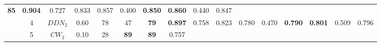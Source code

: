 \begin{table}[tph]
\begin{adjustbox}{angle=90}
{\begin{tabular}{c|c|cc|ccc|ccc|ccc|ccc}
                \textbf{85}
                                                                        &
                \textbf{0.904}
                                                                        & 0.727
                                                                        & 0.833                          &
                0.857                                                   & 0.400
                                                                        &
                \textbf{0.850}
                                                                        &
                \textbf{0.860}
                                                                        & 0.440
                                                                        & 0.847
                \\
                                                                        & 4
                                                                        & $DDN_{2}$                      & 0.60
                                                                        & 78                             & 47
                                                                        &
                \textbf{79}
                                                                        &
                \textbf{0.897}
                                                                        & 0.758
                                                                        & 0.823                          &
                0.780                                                   & 0.470
                                                                        &
                \textbf{0.790}
                                                                        &
                \textbf{0.801}
                                                                        & 0.509
                                                                        & 0.796
                \\
                                                                        & 5
                                                                        & $CW_{2}$                       & 0.10
                                                                        & 28                             &
                \textbf{89}
                                                                        &
                \textbf{89}
                                                                        & 0.757
                                                                        &

\end{tabular}}
\end{adjustbox}
\end{table}
